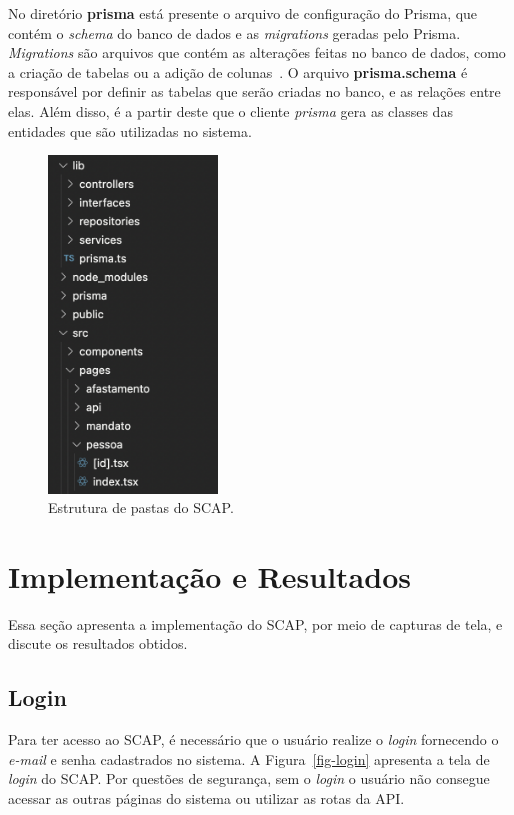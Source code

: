 No diretório \textbf{prisma} está presente o arquivo de configuração do Prisma, que contém o \textit{schema} do banco de dados e as \textit{migrations}
geradas pelo Prisma. \textit{Migrations} são arquivos que contém as alterações feitas no banco de dados, como a criação de tabelas ou a adição de colunas~\cite{prisma:2020}.
O arquivo \textbf{prisma.schema} é responsável por definir as tabelas que serão criadas no banco, e as relações entre elas. Além disso, é a partir deste que 
o cliente \textit{prisma} gera as classes das entidades que são utilizadas no sistema.


\begin{figure}
    \centering
    \includegraphics[width=0.4\textwidth]{figuras/fig-pastas.png}
    \caption{Estrutura de pastas do SCAP.}
    \label{fig-pastas}
\end{figure}


\section{Implementação e Resultados}
\label{sec-projeto-impl}

Essa seção apresenta a implementação do SCAP, por meio de capturas de tela,
e discute os resultados obtidos.

\subsection{Login}
\label{subsec-projeto-login}

Para ter acesso ao SCAP, é necessário que o usuário realize o \textit{login} fornecendo o \textit{e-mail}
e senha cadastrados no sistema. A Figura~\ref{fig-login} apresenta a tela de \textit{login} do SCAP.
Por questões de segurança, sem o \textit{login} o usuário não consegue acessar as outras páginas do sistema
ou utilizar as rotas da API.

